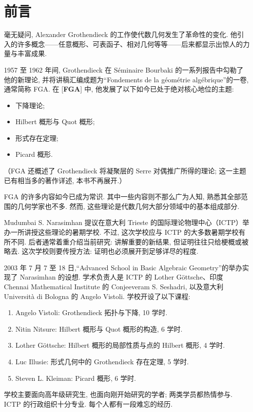 \chapter*{前言}
毫无疑问, Alexander Grothendieck 的工作使代数几何发生了革命性的变化. 他引入的许多概念——任意概形、可表函子、相对几何等等——后来都显示出惊人的力量与丰富成果.

1957 至 1962 年间, Grothendieck 在 Séminaire Bourbaki 的一系列报告中勾勒了他的新理论, 并将讲稿汇编成题为“Fondements de la géométrie algébrique”的一卷, 通常简称 FGA. 在 [\textbf{FGA}] 中, 他发展了以下如今已处于绝对核心地位的主题:
\begin{itemize}
\item 下降理论;
\item Hilbert 概形与 Quot 概形;
\item 形式存在定理;
\item Picard 概形.
\end{itemize}
（FGA 还概述了 Grothendieck 将凝聚层的 Serre 对偶推广所得的理论; 这一主题已有相当多的著作详述, 本书不再展开.）

FGA 的许多内容如今已成为常识. 其中一些内容则不那么广为人知, 熟悉其全部范围的几何学家也不多. 然而, 这些理论是代数几何大部分领域中的基本组成部分.

Mudumbai S. Narasimhan 提议在意大利 Trieste 的国际理论物理中心（ICTP）举办一所讲授这些理论的暑期学校. 不过, 这次学校应与 ICTP 的大多数暑期学校有所不同. 后者通常着重介绍当前研究: 讲解重要的新结果, 但证明往往只给梗概或被略去. 这次学校则要传授方法: 证明也必须展开到足够详尽的程度.

2003 年 7 月 7 至 18 日,“Advanced School in Basic Algebraic Geometry”的举办实现了 Narasimhan 的设想. 学术负责人是 ICTP 的 Lother Göttsche、印度 Chennai Mathematical Institute 的 Conjeeveram S. Seshadri, 以及意大利 Università di Bologna 的 Angelo Vistoli. 学校开设了以下课程:
\begin{enumerate}[label=(\arabic*)]
\item Angelo Vistoli: Grothendieck 拓扑与下降, 10 学时.
\item Nitin Nitsure: Hilbert 概形与 Quot 概形的构造, 6 学时.
\item Lother Göttsche: Hilbert 概形的局部性质与点的 Hilbert 概形, 4 学时.
\item Luc Illusie: 形式几何中的 Grothendieck 存在定理, 5 学时.
\item Steven L. Kleiman: Picard 概形, 6 学时.
\end{enumerate}
学校主要面向高年级研究生, 也面向刚开始研究的学者; 两类学员都热情参与. ICTP 的行政组织十分专业. 每个人都有一段难忘的经历.

